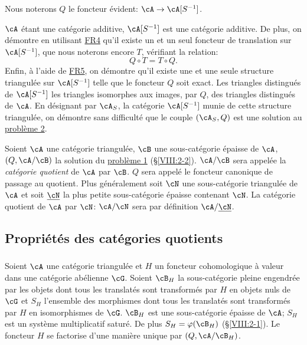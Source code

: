 Nous noterons $Q$ le foncteur évident: $\cA\to \cA[S^{-1}]$. 

$\cA$ étant une catégorie additive, $\cA[S^{-1}]$ est une catégorie 
additive. De plus, on démontre en utilisant \hyperlink{VIII:FR4}{FR4} qu'il 
existe un et un seul foncteur de translation sur $\cA[S^{-1}]$, que nous 
noterons encore $T$, vérifiant la relation: 
\[
  Q\circ T = T\circ Q \text{.}
\]
Enfin, à l'aide de \hyperlink{VIII:FR5}{FR5}, on démontre qu'il existe une 
et une seule structure triangulée sur $\cA[S^{-1}]$ telle que le foncteur $Q$ 
soit exact. Les triangles distingués de $\cA[S^{-1}]$  les 
triangles isomorphes aux images, par $Q$, des triangles distingués de $\cA$. 
En désignant par $\cA_S$, la catégorie $\cA[S^{-1}]$ munie de cette 
structure triangulée, on démontre sans difficulté que le couple 
$(\cA_S,Q)$ est une solution au \hyperlink{VIII:prob2}{problème 2}. 





\begin{definition}\label{VIII:2-3-3}
Soient $\cA$ une catégorie triangulée, $\cB$ une sous-catégorie épaisse 
de $\cA$, $(Q,\cA/\cB)$ la solution du \hyperlink{VIII:prob1}{problème 1} 
(\S \ref{VIII:2-2}). $\cA/\cB$ sera appelée la \emph{catégorie quotient} de 
$\cA$ par $\cB$. $Q$ sera appelé le foncteur canonique de passage au 
quotient. Plus généralement soit $\cN$ une sous-catégorie triangulée de 
$\cA$ et soit $\underline\cN$ la plus petite sous-catégorie épaisse 
contenant $\cN$. La catégorie quotient de $\cA$ par $\cN$: $\cA/\cN$ sera par 
définition $\cA/\underline\cN$. 
\end{definition}










\subsection{Propriétés des catégories quotients}\label{VIII:2-4}





\subsubsection{}\label{VIII:2-4-1}

Soient $\cA$ une catégorie triangulée et $H$ un foncteur cohomologique à 
valeur dans une catégorie abélienne $\cG$. Soient $\cB_H$ la 
sous-catégorie pleine engendrée par les objets dont tous les translatés 
sont transformés par $H$ en objets nuls de $\cG$ et $S_H$ l'ensemble des 
morphismes dont tous les translatés sont transformés par $H$ en 
isomorphismes de $\cG$. $\cB_H$ est une sous-catégorie épaisse de $\cA$; 
$S_H$ est un système multiplicatif saturé. De plus $S_H=\varphi(\cB_H)$ 
(\S \ref{VIII:2-1}). Le foncteur $H$ se factorise d'une manière unique par 
$(Q,\cA/\cB_H)$. 





